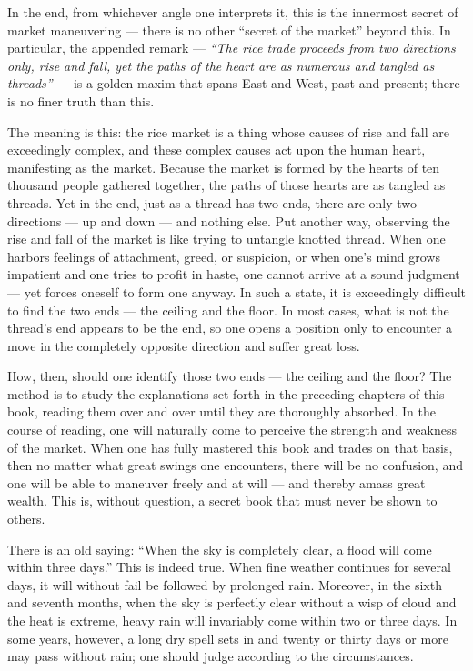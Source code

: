 In the end, from whichever angle one interprets it, this is the
innermost secret of market maneuvering --- there is no other
``secret of the market'' beyond this. In particular, the appended
remark --- \textit{``The rice trade proceeds from two directions only, rise
and fall, yet the paths of the heart are as numerous and tangled as
threads''} --- is a golden maxim that spans East and West, past and
present; there is no finer truth than this.

The meaning is this: the rice market is a thing whose causes of rise
and fall are exceedingly complex, and these complex causes act upon
the human heart, manifesting as the market. Because the market is
formed by the hearts of ten thousand people gathered together, the
paths of those hearts are as tangled as threads. Yet in the end, just
as a thread has two ends, there are only two directions --- up and
down --- and nothing else. Put another way, observing the rise and
fall of the market is like trying to untangle knotted thread. When
one harbors feelings of attachment, greed, or suspicion, or when
one's mind grows impatient and one tries to profit in haste, one
cannot arrive at a sound judgment --- yet forces oneself to form one
anyway. In such a state, it is exceedingly difficult to find the two
ends --- the ceiling and the floor. In most cases, what is not the
thread's end appears to be the end, so one opens a position only to
encounter a move in the completely opposite direction and suffer
great loss.

How, then, should one identify those two ends --- the ceiling and
the floor? The method is to study the explanations set forth in
the preceding chapters of this book, reading them over and over
until they are thoroughly absorbed. In the course of reading, one
will naturally come to perceive the strength and weakness of the
market. When one has fully mastered this book and trades on that
basis, then no matter what great swings one encounters, there will
be no confusion, and one will be able to maneuver freely and at
will --- and thereby amass great wealth. This is, without question,
a secret book that must never be shown to others.


\begin{sokyubox}
{\small\itshape\color{sokyubar} }

\medskip
There is an old saying: ``When the sky is completely clear, a flood
will come within three days.'' This is indeed true. When fine weather
continues for several days, it will without fail be followed by
prolonged rain. Moreover, in the sixth and seventh months, when the
sky is perfectly clear without a wisp of cloud and the heat is
extreme, heavy rain will invariably come within two or three days.
In some years, however, a long dry spell sets in and twenty or
thirty days or more may pass without rain; one should judge according
to the circumstances.
\end{sokyubox}

